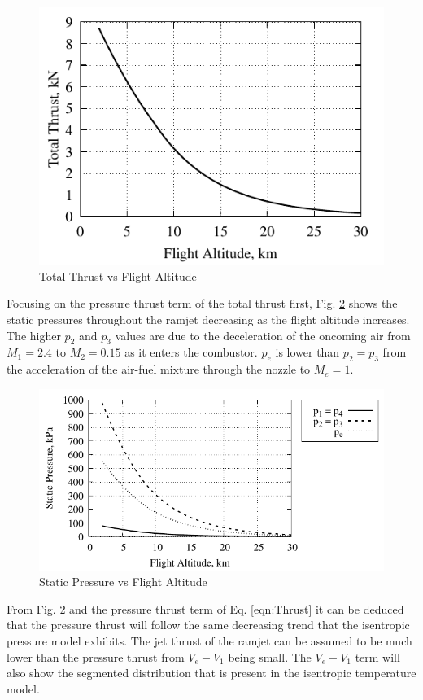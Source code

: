\documentclass[conf]{new-aiaa} %
\begin{document}
\begin{figure}[H] %
    \centering
    \includegraphics[]{media/performance_parameter_files/part_d_T.pdf}
    \caption{\label{fig:partdt}Total Thrust vs Flight Altitude}
\end{figure}
Focusing on the pressure thrust term of the total thrust first, Fig. \ref{fig:partdstatpres} shows the static pressures throughout the ramjet decreasing as the flight altitude increases. The higher $p_2$ and $p_3$ values are due to the deceleration of the oncoming air from $M_1=2.4$ to $M_2=0.15$ as it enters the combustor. $p_e$ is lower than $p_2=p_3$ from the acceleration of the air-fuel mixture through the nozzle to $M_e=1$.

\begin{figure}[H] %
    \centering
    \includegraphics[]{media/performance_parameter_files/part_d_static_pressure.pdf}
    \caption{\label{fig:partdstatpres}Static Pressure vs Flight Altitude}
\end{figure}
From Fig. \ref{fig:partdstatpres} and the pressure thrust term of Eq. \ref{eqn:Thrust} it can be deduced that the pressure thrust will follow the same decreasing trend that the isentropic pressure model exhibits. The jet thrust of the ramjet can be assumed to be much lower than the pressure thrust from $V_e-V_1$ being small. The $V_e-V_1$ term will also show the segmented distribution that is present in the isentropic temperature model.
\end{document}
